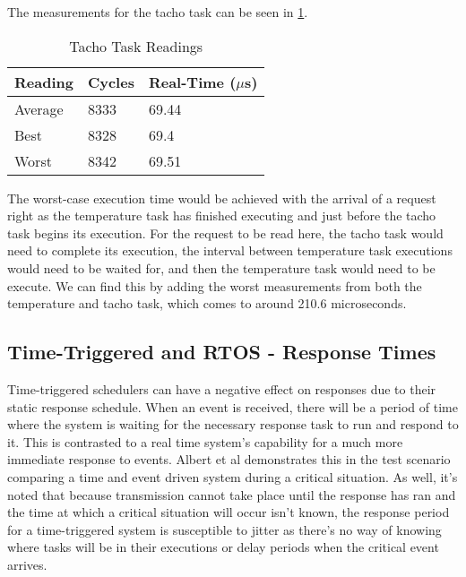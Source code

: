 \documentclass[]{report}
\begin{document}
			The measurements for the tacho task can be seen in \ref{executionmeasurementstacho}.
			
			\begin{table}[h]
				\centering
				\begin{tabular}{| l | l | l |} 
					\hline
					Reading & Cycles & Real-Time ($\mu $s) \\ [0.5ex] 
					\hline
					Average  & 8333 & 69.44 \\ 
					Best & 8328 & 69.4 \\
					Worst & 8342 & 69.51 \\
					\hline
				\end{tabular}
				\caption{Tacho Task Readings}
				\label{executionmeasurementstacho}
			\end{table}
		
			The worst-case execution time would be achieved with the arrival of a request right as the temperature task has finished executing and just before the tacho task begins its execution. For the request to be read here, the tacho task would need to complete its execution, the interval between temperature task executions would need to be waited for, and then the temperature task would need to be execute. We can find this by adding the worst measurements from both the temperature and tacho task, which comes to around 210.6 microseconds.
			
			\subsection{Time-Triggered and RTOS - Response Times}
			Time-triggered schedulers can have a negative effect on responses due to their static response schedule. When an event is received, there will be a period of time where the system is waiting for the necessary response task to run and respond to it. This is contrasted to a real time system's capability for a much more immediate response to events. Albert et al\cite{albert2004comparison} demonstrates this in the test scenario comparing a time and event driven system during a critical situation. As well, it's noted that because transmission cannot take place until the response has ran and the time at which a critical situation will occur isn't known, the response period for a time-triggered system is susceptible to jitter as there's no way of knowing where tasks will be in their executions or delay periods when the critical event arrives.
			
\end{document}
